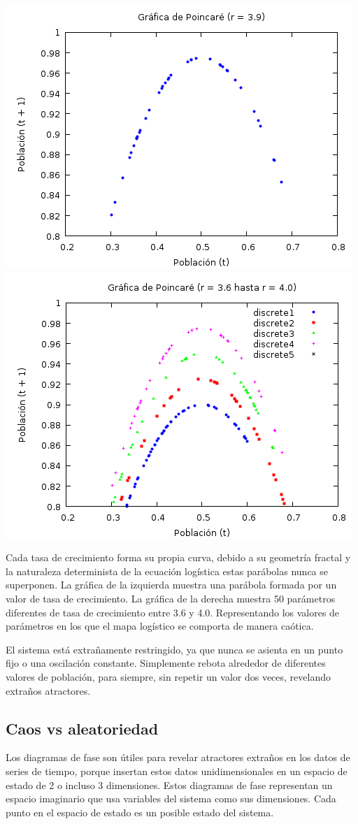 \documentclass{article}
\begin{document}
\begin{center}
\includegraphics[width=.6\textwidth]{Imagen8.png}
\includegraphics[width=.6\textwidth]{Imagen9.png}
\end{center}

Cada tasa de crecimiento forma su propia curva, debido a su geometría fractal y la naturaleza determinista de la ecuación logística estas parábolas nunca se superponen. La gráfica de la izquierda muestra una parábola formada por un valor de tasa de crecimiento. La gráfica de la derecha muestra 50 parámetros diferentes de tasa de crecimiento entre 3.6 y 4.0. Representando los valores de parámetros en los que el mapa logístico se comporta de manera caótica.

El sistema está extrañamente restringido, ya que nunca se asienta en un punto fijo o una oscilación constante. Simplemente rebota alrededor de diferentes valores de población, para siempre, sin repetir un valor dos veces, revelando extraños atractores.

\subsection{Caos vs aleatoriedad}

Los diagramas de fase son útiles para revelar atractores extraños en los datos de series de tiempo, porque insertan estos datos unidimensionales en un espacio de estado de 2 o incluso 3 dimensiones. Estos diagramas de fase representan un espacio imaginario que usa variables del sistema como sus dimensiones. Cada punto en el espacio de estado es un posible estado del sistema.
\end{document}
